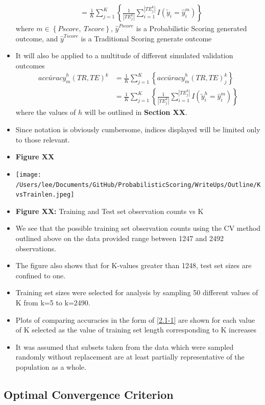 \documentclass[12pt,]{article}
\begin{document}
\begin{itemize}
\begin{align*}
    &=  \frac{1}{K}\sum_{j=1}^{K} \left \{ \frac{1}{|TE_{j}^{k}|} \sum_{i=1}^{|TE_{j}^{k}|} I\left(\tilde{y}_{i}=\hat{y}_{i}^{m} \right) \right \}
  \end{align*} where \(m\in\left \{ Pscore, \ Tscore \right \}\),
  \(\hat{y}^{Pscore}\) is a Probabilistic Scoring generated outcome, and
  \(\hat{y}^{Tscore}\) is a Traditional Scoring generate outcome
\item
  It will also be applied to a multitude of different simulated
  validation outcomes \begin{eqnarray*}
    \tilde{accuracy}_{m}^{h}\left(TR, TE \right)^{k} &= \frac{1}{K}\sum_{j=1}^{K} \left \{ \tilde{accuracy}_{m}^{h}\left(TR, TE \right)_{j}^{k}\right \} \\
    &=  \frac{1}{K}\sum_{j=1}^{K} \left \{ \frac{1}{|TE_{j}^{k}|} \sum_{i=1}^{|TE_{j}^{k}|} I\left(\tilde{y}_{i}^{h}=\hat{y}_{i}^{m} \right) \right \}
  \end{eqnarray*} where the values of \(h\) will be outlined in
  \textbf{Section XX}.
\item
  Since notation is obviously cumbersome, indices displayed will be
  limited only to those relevant.
\item
  \textbf{Figure XX}
\item
  \texttt{[image: /Users/lee/Documents/GitHub/ProbabilisticScoring/WriteUps/Outline/KvsTrainlen.jpeg]}
\item
  \textbf{Figure XX:} Training and Test set observation counts vs K
\item
  We see that the possible training set observation counts using the CV
  method outlined above on the data provided range between 1247 and 2492
  observations.
\item
  The figure also shows that for K-values greater than 1248, test set
  sizes are confined to one.
\item
  Training set sizes were selected for analysis by sampling 50 different
  values of K from k=5 to k=2490.
\item
  Plots of comparing accuracies in the form of \eqref{2.1-1} are shown
  for each value of K selected as the value of training set length
  corresponding to K increases
\item
  It was assumed that subsets taken from the data which were sampled
  randomly without replacement are at least partially representative of
  the population as a whole.
\end{itemize}

\hypertarget{optimal-convergence-criterion}{%
\subsection{Optimal Convergence
Criterion}\label{optimal-convergence-criterion}}
\end{document}
